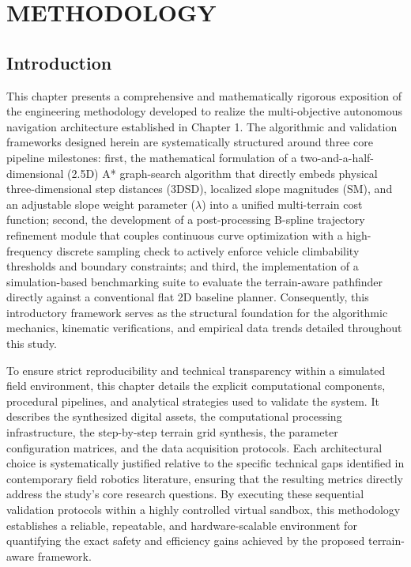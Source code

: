 \chapter{METHODOLOGY}

\section{Introduction}

This chapter presents a comprehensive and mathematically rigorous exposition of the engineering
methodology developed to realize the multi-objective autonomous navigation architecture established
in Chapter 1. The algorithmic and validation frameworks designed herein are systematically
structured around three core pipeline milestones: first, the mathematical formulation of a
two-and-a-half-dimensional (2.5D) A* graph-search algorithm that directly embeds physical
three-dimensional step distances (3DSD), localized slope magnitudes (SM), and an adjustable slope
weight parameter ($\lambda$) into a unified multi-terrain cost function; second, the development of
a post-processing B-spline trajectory refinement module that couples continuous curve optimization
with a high-frequency discrete sampling check to actively enforce vehicle climbability thresholds
and boundary constraints; and third, the implementation of a simulation-based benchmarking suite to
evaluate the terrain-aware pathfinder directly against a conventional flat 2D baseline planner.
Consequently, this introductory framework serves as the structural foundation for the algorithmic
mechanics, kinematic verifications, and empirical data trends detailed throughout this study.

To ensure strict reproducibility and technical transparency within a simulated field environment,
this chapter details the explicit computational components, procedural pipelines, and analytical
strategies used to validate the system. It describes the synthesized digital assets, the
computational processing infrastructure, the step-by-step terrain grid synthesis, the parameter
configuration matrices, and the data acquisition protocols. Each architectural choice is
systematically justified relative to the specific technical gaps identified in contemporary field
robotics literature, ensuring that the resulting metrics directly address the study's core research
questions. By executing these sequential validation protocols within a highly controlled virtual
sandbox, this methodology establishes a reliable, repeatable, and hardware-scalable environment for
quantifying the exact safety and efficiency gains achieved by the proposed terrain-aware framework.

